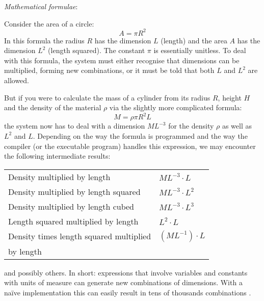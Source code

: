 \documentclass{article}
\begin{document}
\vspace{\baselineskip}
\noindent \emph{Mathematical formulae}:

\noindent Consider the area of a circle:
\begin{equation}
    A = \pi R^2
\end{equation}
%
In this formula the radius $R$ has the dimension $L$ (length) and the area $A$ has the dimension $L^2$ (length squared). The
constant $\pi$ is essentially unitless. To deal with this formula, the system must either recognise that dimensions can
be multiplied, forming new combinations, or it must be told that both $L$ and $L^2$ are allowed.

But if you were to calculate the mass of a cylinder from its radius $R$, height $H$ and the density of the material $\rho$
via the slightly more complicated formula:
\begin{equation}
    M = \rho \pi R^2 L
\end{equation}
\noindent the system now has to deal with a dimension $M L^{-3}$ for the density $\rho$ as well as $L^2$ and $L$. Depending on the way the
formula is programmed and the way the compiler (or the executable program) handles this expression, we may encounter the
following intermediate results:

\vspace{\baselineskip}
\begin{tabular}{ll}
\hline
Density multiplied by length                       &   $M L^{-3} \cdot L$   \\
Density multiplied by length squared               &   $M L^{-3} \cdot L^2$ \\
Density multiplied by length cubed                 &   $M L^{-3} \cdot L^3$ \\
Length squared multiplied by length                &   $L^2 \cdot L$        \\
Density times length squared multiplied            &   $(M L^{-1}) \cdot L$ \\
by length                                          &                        \\
\hline
\end{tabular}
\vspace{\baselineskip}

\noindent and possibly others. In short: expressions that involve variables and constants with units of measure can generate
new combinations of dimensions. With a na\"ive implementation this can easily result in tens of thousands
combinations \cite{UnitsOfMeasureFortran}.
\end{document}
